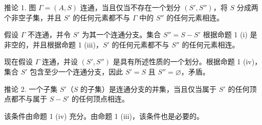 推论 1. 图 \(\Gamma = (A, S)\) 连通，当且仅当不存在一个划分 \((S', S'')\)，将 \(S\) 分成两个非空子集，并且 \(S'\) 的任何元素都不与 \(\Gamma\) 中的 \(S''\) 的任何元素相连。

假设 \(\Gamma\) 不连通，并令 \(S'\) 为其一个连通分支。集合 \(S'' = S - S'\) 根据命题 1 (i) 是非空的，并且根据命题 1 (iii)，\(S'\) 的任何元素都不与 \(S''\) 的任何元素相连。

现在假设 \(\Gamma\) 连通，并设 \((S', S'')\) 是具有所述性质的一个划分。根据命题 1 (iv)，集合 \(S'\) 包含至少一个连通分支，因此 \(S' = S\) 且 \(S'' = \varnothing\)，矛盾。

推论 2. 一个子集 \(S'\)（\(S\) 的子集）是连通分支的并集，当且仅当属于 \(S'\) 的任何顶点都不与属于 \(S - S'\) 的任何顶点相连。

该条件由命题 1 (iv) 充分。由命题 1 (iii)，该条件也是必要的。

